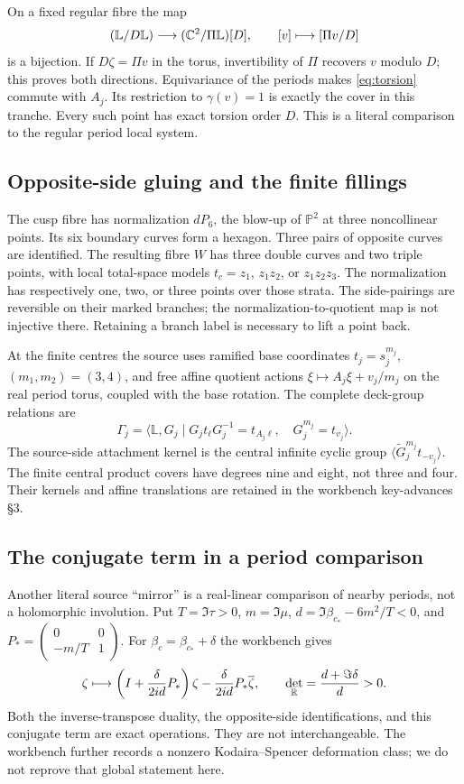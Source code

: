 On a fixed regular fibre the map
\begin{equation}\label{eq:torsion}
 (\mathbb L/D\mathbb L)\longrightarrow
 (\mathbb C^2/\Pi\mathbb L)[D],\qquad
 [v]\longmapsto[\Pi v/D]
\end{equation}
is a bijection. If $D\zeta=\Pi v$ in the torus, invertibility of $\Pi$
recovers $v$ modulo $D$; this proves both directions. Equivariance of the
periods makes \eqref{eq:torsion} commute with $A_j$.
Its restriction to $\gamma(v)=1$ is exactly the cover in this tranche.
Every such point has exact torsion order $D$.
This is a literal comparison to the regular period local system.

\subsection{Opposite-side gluing and the finite fillings}
The cusp fibre has normalization $dP_6$, the blow-up of $\mathbb P^2$ at
three noncollinear points. Its six boundary curves form a hexagon. Three
pairs of opposite curves are identified. The resulting fibre $W$ has
three double curves and two triple points, with local total-space models
$t_c=z_1$, $z_1z_2$, or $z_1z_2z_3$.
The normalization has respectively one, two, or three points over those
strata. The side-pairings are reversible on their marked branches; the
normalization-to-quotient map is not injective there. Retaining a branch
label is necessary to lift a point back.

At the finite centres the source uses ramified base coordinates
$t_j=s_j^{m_j}$, $(m_1,m_2)=(3,4)$, and free affine quotient actions
$\xi\mapsto A_j\xi+v_j/m_j$ on the real period torus, coupled with the
base rotation. The complete deck-group relations are
\[
 \Gamma_j=\langle\mathbb L,G_j\mid
 G_jt_\ell G_j^{-1}=t_{A_j\ell},\quad G_j^{m_j}=t_{v_j}\rangle.
\]
The source-side attachment kernel is the central infinite cyclic group
$\langle\widetilde G_j^{m_j}t_{-v_j}\rangle$.
The finite central product covers have degrees nine and eight, not three
and four. Their kernels and affine translations are retained in the
workbench key-advances \S3.

\subsection{The conjugate term in a period comparison}
Another literal source ``mirror'' is a real-linear comparison of nearby
periods, not a holomorphic involution. Put
$T=\Im\tau>0$, $m=\Im\mu$,
$d=\Im\beta_{c_*}-6m^2/T<0$, and
$P_*=\left(\begin{smallmatrix}0&0\\-m/T&1\end{smallmatrix}\right)$.
For $\beta_c=\beta_{c_*}+\delta$ the workbench gives
\[
 \zeta\longmapsto
 \left(I+\frac{\delta}{2id}P_*\right)\zeta
 -\frac{\delta}{2id}P_*\overline\zeta,
 \qquad \det_{\mathbb R}=\frac{d+\Im\delta}{d}>0.
\]
Both the inverse-transpose duality, the opposite-side identifications,
and this conjugate term are exact operations. They are not interchangeable.
The workbench further records a nonzero Kodaira--Spencer deformation class;
we do not reprove that global statement here.

